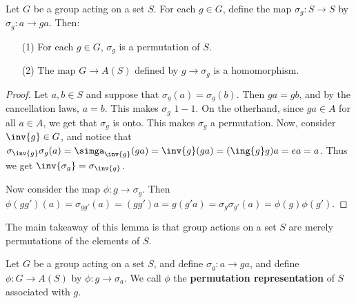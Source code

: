 \begin{lemma}\label{1.7.1}
    Let $G$ be a group acting on a set $S$. For each $g \in G$, define the map
    $\sigma_g:S \rightarrow S$ by $\sigma_g:a \rightarrow ga$. Then:
    \begin{enumerate}
        \item[(1)] For each $g \in G$,  $\sigma_g$ is a permutation of  $S$.

        \item [(2)] The map $G \rightarrow A(S)$ defined by $g \rightarrow
            \sigma_g$ is a homomorphism.
    \end{enumerate}
\end{lemma}
\begin{proof}
    Let $a,b \in S$ and suppose that $\sigma_g(a)=\sigma_g(b)$. Then $ga=gb$,
    and by the cancellation laws,  $a=b$. This makes $\sigma_g$  $1-1$. On the
    otherhand, since $ga \in A$ for all $a \in A$, we get that $\sigma_g$ is
    onto. This makes  $\sigma_g$ a permutation. Now, consider  $\inv{g} \in G$,
    and notice that
    $\sigma_{\inv{g}}\sigma_g(a)=\simga_{\inv{g}}(ga)=\inv{g}(ga)=(\ing{g}g)a=ea=a$.
    Thus we get $\inv{\sigma_g}=\sigma_{\inv{g}}$.

    Now consider the map $\phi:g \rightarrow \sigma_g$. Then
    $\phi(gg')(a)=\sigma_{gg'}(a)=(gg')a=g(g'a)=\sigma_g\sigma_{g'}(a)=
    \phi(g)\phi(g')$.
\end{proof}
\begin{remark}
    The main takeaway of this lemma is that group actions on a set $S$ are
    merely permutations of the elements of  $S$.
\end{remark}

\begin{definition}
    Let $G$ be a group acting on a set  $S$, and define $\sigma_g:a \rightarrow
    ga$, and define $\phi:G \rightarrow A(S)$ by $\phi:g \rightarrow \sigma_a$.
    We call $\phi$ the  \textbf{permutation representation} of $S$ associated
    with  $g$.
\end{definition}

